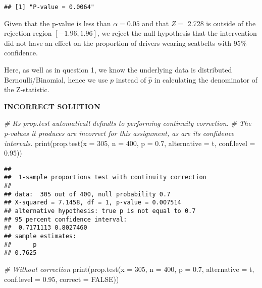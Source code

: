 \documentclass[
]{article}
\newenvironment{Shaded}{\begin{snugshade}}{\end{snugshade}}
\newcommand{\AttributeTok}[1]{\textcolor[rgb]{0.77,0.63,0.00}{#1}}
\newcommand{\CommentTok}[1]{\textcolor[rgb]{0.56,0.35,0.01}{\textit{#1}}}
\newcommand{\ConstantTok}[1]{\textcolor[rgb]{0.00,0.00,0.00}{#1}}
\newcommand{\DecValTok}[1]{\textcolor[rgb]{0.00,0.00,0.81}{#1}}
\newcommand{\FloatTok}[1]{\textcolor[rgb]{0.00,0.00,0.81}{#1}}
\newcommand{\FunctionTok}[1]{\textcolor[rgb]{0.00,0.00,0.00}{#1}}
\newcommand{\NormalTok}[1]{#1}
\newcommand{\StringTok}[1]{\textcolor[rgb]{0.31,0.60,0.02}{#1}}
\begin{document}
\begin{verbatim}
## [1] "P-value = 0.0064"
\end{verbatim}

Given that the p-value is less than \(\alpha = 0.05\) and that \(Z=\)
2.728 is outside of the rejection region \([-1.96, 1.96]\), we reject
the null hypothesis that the intervention did not have an effect on the
proportion of drivers wearing seatbelts with 95\% confidence.

Here, as well as in question 1, we know the underlying data is
distributed Bernoulli/Binomial, hence we use \(p\) instead of
\(\hat{p}\) in calculating the denominator of the Z-statistic.

\textbf{INCORRECT SOLUTION}

\begin{Shaded}
\begin{Highlighting}[]
\CommentTok{\# R\textquotesingle{}s prop.test automaticall defaults to performing continuity correction.}
\CommentTok{\# The p{-}values it produces are incorrect for this assignment, as are its confidence intervals.}
\FunctionTok{print}\NormalTok{(}\FunctionTok{prop.test}\NormalTok{(}\AttributeTok{x =} \DecValTok{305}\NormalTok{, }\AttributeTok{n =} \DecValTok{400}\NormalTok{, }\AttributeTok{p =} \FloatTok{0.7}\NormalTok{, }\AttributeTok{alternative =} \StringTok{\textquotesingle{}t\textquotesingle{}}\NormalTok{, }\AttributeTok{conf.level =} \FloatTok{0.95}\NormalTok{))}
\end{Highlighting}
\end{Shaded}

\begin{verbatim}
## 
##  1-sample proportions test with continuity correction
## 
## data:  305 out of 400, null probability 0.7
## X-squared = 7.1458, df = 1, p-value = 0.007514
## alternative hypothesis: true p is not equal to 0.7
## 95 percent confidence interval:
##  0.7171113 0.8027460
## sample estimates:
##      p 
## 0.7625
\end{verbatim}

\begin{Shaded}
\begin{Highlighting}[]
\CommentTok{\# Without correction}
\FunctionTok{print}\NormalTok{(}\FunctionTok{prop.test}\NormalTok{(}\AttributeTok{x =} \DecValTok{305}\NormalTok{, }\AttributeTok{n =} \DecValTok{400}\NormalTok{, }\AttributeTok{p =} \FloatTok{0.7}\NormalTok{, }\AttributeTok{alternative =} \StringTok{\textquotesingle{}t\textquotesingle{}}\NormalTok{, }\AttributeTok{conf.level =} \FloatTok{0.95}\NormalTok{, }\AttributeTok{correct =} \ConstantTok{FALSE}\NormalTok{))}
\end{Highlighting}
\end{Shaded}
\end{document}
